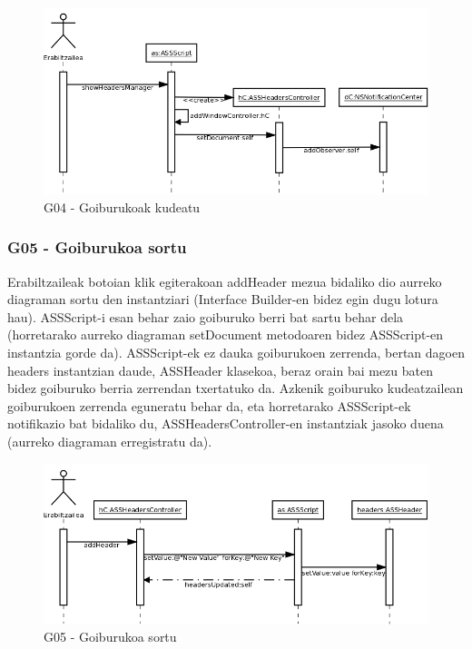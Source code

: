 \begin{figure}[htp]
\begin{center}
\includegraphics[scale=0.35]{Pictures/Chapter4/Diseinua/G04.png}
\caption{G04 - Goiburukoak kudeatu}
\label{g04d}
\end{center}
\end{figure}

\subsubsection{G05 - Goiburukoa sortu}
Erabiltzaileak botoian klik egiterakoan addHeader mezua bidaliko dio aurreko diagraman sortu den instantziari (Interface Builder-en bidez egin dugu lotura hau). ASSScript-i esan behar zaio goiburuko berri bat sartu behar dela (horretarako aurreko diagraman setDocument metodoaren bidez ASSScript-en instantzia gorde da). ASSScript-ek ez dauka goiburukoen zerrenda, bertan dagoen headers instantzian daude, ASSHeader klasekoa, beraz orain bai mezu baten bidez goiburuko berria zerrendan txertatuko da. Azkenik goiburuko kudeatzailean goiburukoen zerrenda eguneratu behar da, eta horretarako ASSScript-ek notifikazio bat bidaliko du, ASSHeadersController-en instantziak jasoko duena (aurreko diagraman erregistratu da).

\begin{figure}[htp]
\begin{center}
\includegraphics[scale=0.35]{Pictures/Chapter4/Diseinua/G05.png}
\caption{G05 - Goiburukoa sortu}
\label{g05d}
\end{center}
\end{figure}

